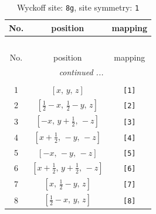 \documentclass[fleqn,8pt]{jsarticle}
\begin{document}
\renewcommand{\arraystretch}{1.2}
\begin{longtable}{ccc}
\caption{Wyckoff site: {\tt 8g}, site symmetry: {\tt 1}}
 \\
 \hline \hline
No. & position & mapping \\ \hline \endfirsthead

\multicolumn{2}{l}{\tablename\ \thetable{}} \\
 \hline \hline
No. & position & mapping \\ \hline \endhead

 \hline \hline
\multicolumn{2}{r}{\footnotesize\it continued ...} \\ \endfoot

 \hline \hline
\multicolumn{2}{r}{} \\ \endlastfoot

1 & $\left[ x,\, y,\, z \right]$ & {\tt [1]} \\ \hline
2 & $\left[ \frac{1}{2} - x,\, \frac{1}{2} - y,\, z \right]$ & {\tt [2]} \\ \hline
3 & $\left[ - x,\, y + \frac{1}{2},\, - z \right]$ & {\tt [3]} \\ \hline
4 & $\left[ x + \frac{1}{2},\, - y,\, - z \right]$ & {\tt [4]} \\ \hline
5 & $\left[ - x,\, - y,\, - z \right]$ & {\tt [5]} \\ \hline
6 & $\left[ x + \frac{1}{2},\, y + \frac{1}{2},\, - z \right]$ & {\tt [6]} \\ \hline
7 & $\left[ x,\, \frac{1}{2} - y,\, z \right]$ & {\tt [7]} \\ \hline
8 & $\left[ \frac{1}{2} - x,\, y,\, z \right]$ & {\tt [8]} \\
\end{longtable}
\end{document}
